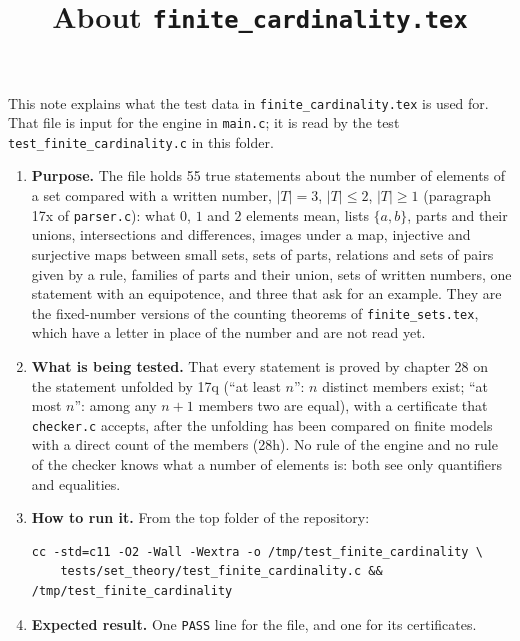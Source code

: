 \documentclass[11pt,a4paper]{article}
\title{About \texttt{finite\_cardinality.tex}}
\author{}
\date{}
\begin{document}
\maketitle
This note explains what the test data in \texttt{finite\_cardinality.tex} is used for. That file is input for the engine in \texttt{main.c}; it is read by the test \texttt{test\_finite\_cardinality.c} in this folder.

\begin{enumerate}
\item \textbf{Purpose.} The file holds 55 true statements about the number of elements of a set compared with a written number, $|T| = 3$, $|T| \le 2$, $|T| \ge 1$ (paragraph 17x of \texttt{parser.c}): what $0$, $1$ and $2$ elements mean, lists $\{a, b\}$, parts and their unions, intersections and differences, images under a map, injective and surjective maps between small sets, sets of parts, relations and sets of pairs given by a rule, families of parts and their union, sets of written numbers, one statement with an equipotence, and three that ask for an example. They are the fixed-number versions of the counting theorems of \texttt{finite\_sets.tex}, which have a letter in place of the number and are not read yet.

\item \textbf{What is being tested.} That every statement is proved by chapter 28 on the statement unfolded by 17q (``at least $n$'': $n$ distinct members exist; ``at most $n$'': among any $n + 1$ members two are equal), with a certificate that \texttt{checker.c} accepts, after the unfolding has been compared on finite models with a direct count of the members (28h). No rule of the engine and no rule of the checker knows what a number of elements is: both see only quantifiers and equalities.

\item \textbf{How to run it.} From the top folder of the repository:
\begin{verbatim}
cc -std=c11 -O2 -Wall -Wextra -o /tmp/test_finite_cardinality \
    tests/set_theory/test_finite_cardinality.c && /tmp/test_finite_cardinality
\end{verbatim}

\item \textbf{Expected result.} One \texttt{PASS} line for the file, and one for its certificates.
\end{enumerate}
\end{document}
